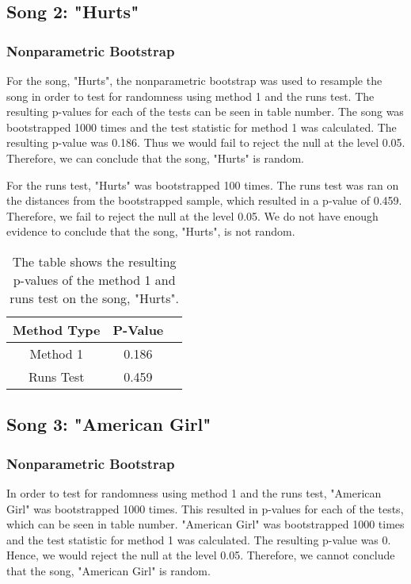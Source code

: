 \documentclass[12pt, letterpaper]{article}
\begin{document}
\subsection{Song 2: "Hurts"}

\subsubsection{Nonparametric Bootstrap}
For the song, "Hurts", the nonparametric bootstrap was used to resample the song in order to test for randomness using method 1 and the runs test. The resulting p-values for each of the tests can be seen in table number. The song was bootstrapped 1000 times and the test statistic for method 1 was calculated. The resulting p-value was 0.186. Thus we would fail to reject the null at the level 0.05. Therefore, we can conclude that the song, "Hurts" is random. 

For the runs test, "Hurts" was bootstrapped 100 times. The runs test was ran on the distances from the bootstrapped sample, which resulted in a p-value of 0.459. Therefore, we fail to reject the null at the level 0.05. We do not have enough evidence to conclude that the song, "Hurts", is not random.
\begin{table}[h]
\begin{center}
\begin{tabular}{|c|c|c|}
\hline
\textbf{Method Type} & P-Value \\
\hline
Method 1 & 0.186  \\
\hline
Runs Test & 0.459 \\ 
\hline
\end{tabular}
\end{center}
\caption{The table shows the resulting p-values of the method 1 and runs test on the song, "Hurts".}
\label{fig: P-values for "Hurts"}
\end{table}

\subsection{Song 3: "American Girl"}

\subsubsection{Nonparametric Bootstrap}
In order to test for randomness using method 1 and the runs test, "American Girl" was bootstrapped 1000 times. This resulted in p-values for each of the tests, which can be seen in table number. "American Girl" was bootstrapped 1000 times and the test statistic for method 1 was calculated. The resulting p-value was 0. Hence, we would reject the null at the level 0.05. Therefore, we cannot conclude that the song, "American Girl" is random. 
\end{document}
